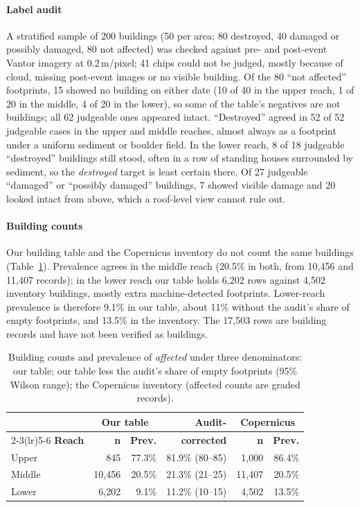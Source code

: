 \documentclass[journal,a4paper]{IEEEtran}
\begin{document}
\paragraph{Label audit} A stratified sample of 200 buildings (50 per area; 80 destroyed, 40 damaged or possibly damaged, 80 not affected) was checked against pre- and post-event Vantor imagery at 0.2\,m/pixel; 41 chips could not be judged, mostly because of cloud, missing post-event images or no visible building. Of the 80 ``not affected'' footprints, 15 showed no building on either date (10 of 40 in the upper reach, 1 of 20 in the middle, 4 of 20 in the lower), so some of the table's negatives are not buildings; all 62 judgeable ones appeared intact. ``Destroyed'' agreed in 52 of 52 judgeable cases in the upper and middle reaches, almost always as a footprint under a uniform sediment or boulder field. In the lower reach, 8 of 18 judgeable ``destroyed'' buildings still stood, often in a row of standing houses surrounded by sediment, so the \emph{destroyed} target is least certain there. Of 27 judgeable ``damaged'' or ``possibly damaged'' buildings, 7 showed visible damage and 20 looked intact from above, which a roof-level view cannot rule out.

\paragraph{Building counts} Our building table and the Copernicus inventory do not count the same buildings (Table~\ref{tab:denom}). Prevalence agrees in the middle reach (20.5\% in both, from 10,456 and 11,407 records); in the lower reach our table holds 6,202 rows against 4,502 inventory buildings, mostly extra machine-detected footprints. Lower-reach prevalence is therefore 9.1\% in our table, about 11\% without the audit's share of empty footprints, and 13.5\% in the inventory. The 17,503 rows are building records and have not been verified as buildings.

\begin{table}[t]
\centering\footnotesize
\setlength{\tabcolsep}{2.5pt}
\caption{Building counts and prevalence of \emph{affected} under three denominators: our table; our table less the audit's share of empty footprints (95\% Wilson range); the Copernicus inventory (affected counts are graded records).}\label{tab:denom}
\begin{tabular}{@{}lrrrrr@{}}
\toprule
 & \multicolumn{2}{c}{\textbf{Our table}} & \textbf{Audit-} & \multicolumn{2}{c}{\textbf{Copernicus}}\\
\cmidrule(lr){2-3}\cmidrule(lr){5-6}
\textbf{Reach} & \textbf{n} & \textbf{Prev.} & \textbf{corrected} & \textbf{n} & \textbf{Prev.}\\
\midrule
Upper & 845 & 77.3\% & 81.9\% (80--85) & 1,000 & 86.4\%\\
Middle & 10,456 & 20.5\% & 21.3\% (21--25) & 11,407 & 20.5\%\\
Lower & 6,202 & 9.1\% & 11.2\% (10--15) & 4,502 & 13.5\%\\
\bottomrule
\end{tabular}
\end{table}
\end{document}
